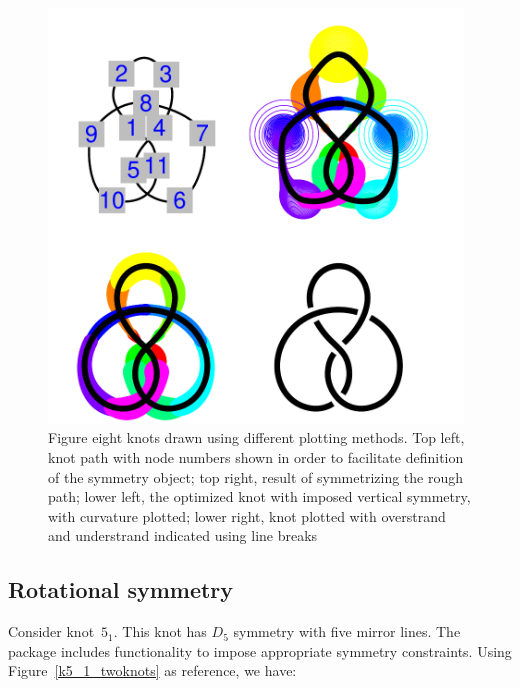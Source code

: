\documentclass{birkjour}
\theoremstyle{definition}
\theoremstyle{remark}
\numberwithin{equation}{section}
\begin{document}
\begin{figure}[!tbp]
  \centering
\includegraphics[width=11cm]{knot-four_figure_eight_knots}  %
\caption{Figure eight knots drawn using different plotting methods.
  Top left, knot path with node numbers shown in order to facilitate
    \label{four_figure_8_knots} definition of the symmetry object; top
    right, result of symmetrizing the rough path; lower left, the
    optimized knot with imposed vertical symmetry, with curvature
    plotted; lower right, knot plotted with overstrand and understrand
    indicated using line breaks}
\end{figure}


\subsection{Rotational symmetry}

Consider knot~$5_1$. This knot has $D_5$ symmetry with five mirror
lines.  The package includes functionality to impose appropriate
symmetry constraints. Using Figure~\ref{k5_1_twoknots} as reference,
we have:
\end{document}
